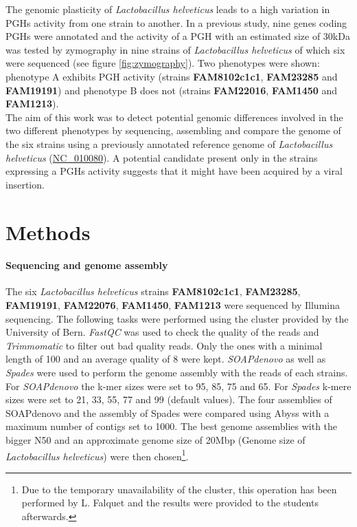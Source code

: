 \documentclass[10pt,a4paper]{article}
\begin{document}
\noindent The genomic plasticity of \textit{Lactobacillus helveticus} leads to a high variation in PGHs activity from one strain to another. 
In a previous study\cite{jebava_nine_2011}, nine genes coding PGHs were annotated and the activity of a PGH with an estimated size of 30kDa was tested by zymography in nine strains of \textit{Lactobacillus helveticus} of which six were sequenced (see figure \ref{fig:zymography}). Two phenotypes were shown: phenotype A exhibits PGH activity (strains \textbf{FAM8102c1c1}, \textbf{FAM23285} and \textbf{FAM19191}) and phenotype B does not (strains \textbf{FAM22016}, \textbf{FAM1450} and \textbf{FAM1213}).\\

\noindent The aim of this work was to detect potential genomic differences involved in the two different phenotypes by sequencing, assembling and compare the genome of the six strains using a previously annotated reference genome of \textit{Lactobacillus helveticus} (\href{https://www.ncbi.nlm.nih.gov/genome/?term=NC_010080}{NC\_010080}). A potential candidate present only in the strains expressing a PGHs activity suggests that it might have been acquired by a viral insertion. 


\section*{\large Methods}

\paragraph{Sequencing and genome assembly}
The six \textit{Lactobacillus helveticus} strains \textbf{FAM8102c1c1}, \textbf{FAM23285}, \textbf{FAM19191}, \textbf{FAM22076}, \textbf{FAM1450}, \textbf{FAM1213}  were sequenced by Illumina sequencing. The following tasks were performed using the cluster provided by the University of Bern.  \textit{FastQC}\cite{andrews2012} was used to check the quality of the reads and \textit{Trimmomatic}\cite{bolger_trimmomatic:_2014} to filter out bad quality reads. Only the ones with a minimal length of 100 and an average quality of 8 were kept. \textit{SOAPdenovo} as well as \textit{Spades} were used to perform the genome assembly with the reads of each strains. For \textit{SOAPdenovo} the k-mer sizes were set to 95, 85, 75 and 65. For \textit{Spades} k-mere sizes were set to 21, 33, 55, 77 and 99 (default values). The four assemblies of SOAPdenovo and the assembly of Spades were compared using Abyss with a maximum number of contigs set to 1000. The best genome assemblies with the bigger N50 and an approximate genome size of 20Mbp (Genome size of \textit{Lactobacillus helveticus}) were then chosen\footnote{Due to the temporary unavailability of the cluster, this operation has been performed by L. Falquet and the results were provided to the students afterwards.}.
\end{document}
